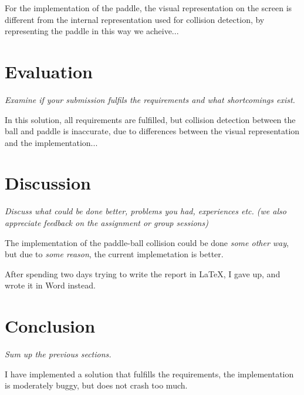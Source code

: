 \documentclass[11pt]{article}
\begin{document}
For the implementation of the paddle, the visual representation on the screen is different from the internal representation used for collision detection, by representing the paddle in this way we acheive...


\section{Evaluation}

\emph{Examine if your submission fulfils the requirements and what shortcomings exist.}

In this solution, all requirements are fulfilled, but collision detection between the ball and paddle is inaccurate, due to differences between the visual representation and the implementation...

\section{Discussion}

\emph{Discuss what could be done better, problems you had, experiences etc. (we also appreciate feedback on the assignment or group sessions) }

The implementation of the paddle-ball collision could be done \emph{some other way}, but due to \emph{some reason}, the current implemetation is better.

After spending two days trying to write the report in \LaTeX, I gave up, and wrote it in Word instead.

\section{Conclusion}

\emph{Sum up the previous sections.}

I have implemented a solution that fulfills the requirements, the implementation is moderately buggy, but does not crash too much.




\end{document}
